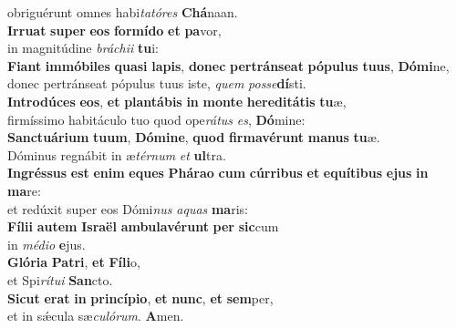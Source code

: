 \evenverse obriguérunt omnes habi\textit{ta}\textit{tó}\textit{res} \textbf{Chá}naan.\\
\oddverse \textbf{Ir}\textbf{ru}\textbf{at} \textbf{su}\textbf{per} \textbf{e}\textbf{os} \textbf{for}\textbf{mí}\textbf{do} \textbf{et} \textbf{pa}vor,~\*\\
\oddverse in magnitúdine \textit{brá}\textit{chi}\textit{i} \textbf{tu}i:\\
\evenverse \textbf{Fi}\textbf{ant} \textbf{im}\textbf{mó}\textbf{bi}\textbf{les} \textbf{qua}\textbf{si} \textbf{la}\textbf{pis}, \textbf{do}\textbf{nec} \textbf{per}\textbf{trán}\textbf{se}\textbf{at} \textbf{pó}\textbf{pu}\textbf{lus} \textbf{tu}\textbf{us}, \textbf{Dó}\textbf{mi}ne,~\*\\
\evenverse donec pertránseat pópulus tuus iste, \textit{quem} \textit{pos}\textit{se}\textbf{dí}sti.\\
\oddverse \textbf{In}\textbf{tro}\textbf{dú}\textbf{ces} \textbf{e}\textbf{os}, \textbf{et} \textbf{plan}\textbf{tá}\textbf{bis} \textbf{in} \textbf{mon}\textbf{te} \textbf{he}\textbf{re}\textbf{di}\textbf{tá}\textbf{tis} \textbf{tu}æ,~\*\\
\oddverse firmíssimo habitáculo tuo quod ope\textit{rá}\textit{tus} \textit{es}, \textbf{Dó}mine:\\
\evenverse \textbf{San}\textbf{ctu}\textbf{á}\textbf{ri}\textbf{um} \textbf{tu}\textbf{um}, \textbf{Dó}\textbf{mi}\textbf{ne}, \textbf{quod} \textbf{fir}\textbf{ma}\textbf{vé}\textbf{runt} \textbf{ma}\textbf{nus} \textbf{tu}æ.~\*\\
\evenverse Dóminus regnábit in æ\textit{tér}\textit{num} \textit{et} \textbf{ul}tra.\\
\oddverse \textbf{In}\textbf{grés}\textbf{sus} \textbf{est} \textbf{e}\textbf{nim} \textbf{e}\textbf{ques} \textbf{Phá}\textbf{ra}\textbf{o} \textbf{cum} \textbf{cúr}\textbf{ri}\textbf{bus} \textbf{et} \textbf{e}\textbf{quí}\textbf{ti}\textbf{bus} \textbf{e}\textbf{jus} \textbf{in} \textbf{ma}re:~\*\\
\oddverse et redúxit super eos Dómi\textit{nus} \textit{a}\textit{quas} \textbf{ma}ris:\\
\evenverse \textbf{Fí}\textbf{li}\textbf{i} \textbf{au}\textbf{tem} \textbf{Is}\textbf{ra}\textbf{ël} \textbf{am}\textbf{bu}\textbf{la}\textbf{vé}\textbf{runt} \textbf{per} \textbf{sic}cum~\*\\
\evenverse in \textit{mé}\textit{di}\textit{o} \textbf{e}jus.\\
\oddverse \textbf{Gló}\textbf{ri}\textbf{a} \textbf{Pa}\textbf{tri}, \textbf{et} \textbf{Fí}\textbf{li}o,~\*\\
\oddverse et Spi\textit{rí}\textit{tu}\textit{i} \textbf{San}cto.\\
\evenverse \textbf{Si}\textbf{cut} \textbf{e}\textbf{rat} \textbf{in} \textbf{prin}\textbf{cí}\textbf{pi}\textbf{o}, \textbf{et} \textbf{nunc}, \textbf{et} \textbf{sem}per,~\*\\
\evenverse et in sǽcula sæ\textit{cu}\textit{ló}\textit{rum}. \textbf{A}men.\\
